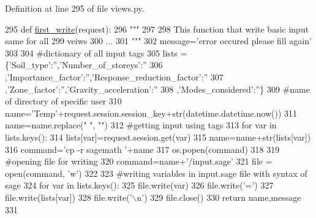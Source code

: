 Definition at line 295 of file views.\+py.


\begin{DoxyCode}
295 \textcolor{keyword}{def }\hyperlink{namespacecivilsage_1_1views_ad9397359f36a9df37e0aa43f3be032a3}{first\_write}(request):
296     \textcolor{stringliteral}{"""}
297 \textcolor{stringliteral}{}
298 \textcolor{stringliteral}{    This function that write basic input same for all}
299 \textcolor{stringliteral}{    veiws}
300 \textcolor{stringliteral}{    ...}
301 \textcolor{stringliteral}{    """}
302     message=\textcolor{stringliteral}{'error occured please fill again'}
303 
304     \textcolor{comment}{#dictionary of all input tags}
305     lists = \{\textcolor{stringliteral}{'Soil\_type'}:\textcolor{stringliteral}{''},\textcolor{stringliteral}{'Number\_of\_storeys'}:\textcolor{stringliteral}{''}
306     ,\textcolor{stringliteral}{'Importance\_factor'}:\textcolor{stringliteral}{''},\textcolor{stringliteral}{'Response\_reduction\_factor'}:\textcolor{stringliteral}{''}
307     ,\textcolor{stringliteral}{'Zone\_factor'}:\textcolor{stringliteral}{''},\textcolor{stringliteral}{'Gravity\_acceleration'}:\textcolor{stringliteral}{''}
308     ,\textcolor{stringliteral}{'Modes\_considered'}:\textcolor{stringliteral}{''}\}
309     \textcolor{comment}{#name of directory of specific user}
310     name=\textcolor{stringliteral}{'Temp'}+request.session.session\_key+str(datetime.datetime.now())
311     name=name.replace(\textcolor{stringliteral}{" "}, \textcolor{stringliteral}{""})
312     \textcolor{comment}{#getting input using tags}
313     \textcolor{keywordflow}{for} var \textcolor{keywordflow}{in} lists.keys():
314         lists[var]=request.session.get(var)
315         name=name+str(lists[var])
316     command=\textcolor{stringliteral}{'cp -r sagemath '}+name
317     os.popen(command)
318 
319     \textcolor{comment}{#opening file for writing}
320     command=name+\textcolor{stringliteral}{'/input.sage'}
321     file = open(command, \textcolor{stringliteral}{'w'})
322 
323     \textcolor{comment}{#writing variables in input.sage file with syntax of sage}
324     \textcolor{keywordflow}{for} var \textcolor{keywordflow}{in} lists.keys():
325         file.write(var)
326         file.write(\textcolor{stringliteral}{'='})
327         file.write(lists[var])
328         file.write(\textcolor{stringliteral}{'\(\backslash\)n'})
329     file.close()
330     \textcolor{keywordflow}{return} name,message
331 \end{DoxyCode}



